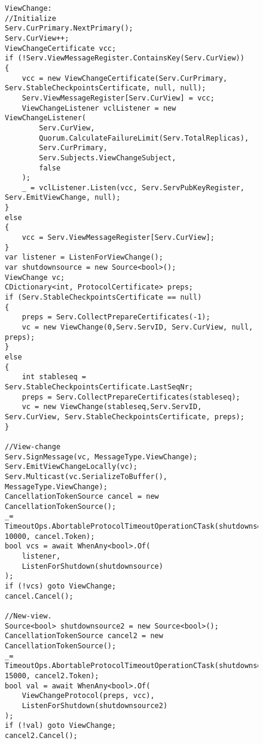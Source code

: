 \begin{figure}[H]
	\centering
	\begin{lstlisting}[label = code:viewchangefunc, caption=Overall source code for handling view-changes., captionpos = b, basicstyle=\scriptsize]
ViewChange:
//Initialize
Serv.CurPrimary.NextPrimary();
Serv.CurView++;
ViewChangeCertificate vcc;
if (!Serv.ViewMessageRegister.ContainsKey(Serv.CurView))
{
    vcc = new ViewChangeCertificate(Serv.CurPrimary, Serv.StableCheckpointsCertificate, null, null);
    Serv.ViewMessageRegister[Serv.CurView] = vcc;
    ViewChangeListener vclListener = new ViewChangeListener(
        Serv.CurView, 
        Quorum.CalculateFailureLimit(Serv.TotalReplicas), 
        Serv.CurPrimary, 
        Serv.Subjects.ViewChangeSubject, 
        false
    );
    _ = vclListener.Listen(vcc, Serv.ServPubKeyRegister, Serv.EmitViewChange, null);
}
else
{   
    vcc = Serv.ViewMessageRegister[Serv.CurView];
}
var listener = ListenForViewChange();
var shutdownsource = new Source<bool>();
ViewChange vc;
CDictionary<int, ProtocolCertificate> preps;
if (Serv.StableCheckpointsCertificate == null)
{
    preps = Serv.CollectPrepareCertificates(-1);
    vc = new ViewChange(0,Serv.ServID, Serv.CurView, null, preps);
}
else
{
    int stableseq = Serv.StableCheckpointsCertificate.LastSeqNr;
    preps = Serv.CollectPrepareCertificates(stableseq);
    vc = new ViewChange(stableseq,Serv.ServID, Serv.CurView, Serv.StableCheckpointsCertificate, preps);
} 

//View-change
Serv.SignMessage(vc, MessageType.ViewChange);
Serv.EmitViewChangeLocally(vc);
Serv.Multicast(vc.SerializeToBuffer(), MessageType.ViewChange);
CancellationTokenSource cancel = new CancellationTokenSource();
_= TimeoutOps.AbortableProtocolTimeoutOperationCTask(shutdownsource, 10000, cancel.Token);
bool vcs = await WhenAny<bool>.Of(
    listener, 
    ListenForShutdown(shutdownsource)
);
if (!vcs) goto ViewChange;
cancel.Cancel();
            
//New-view.
Source<bool> shutdownsource2 = new Source<bool>();
CancellationTokenSource cancel2 = new CancellationTokenSource();
_= TimeoutOps.AbortableProtocolTimeoutOperationCTask(shutdownsource2, 15000, cancel2.Token);
bool val = await WhenAny<bool>.Of(
    ViewChangeProtocol(preps, vcc), 
    ListenForShutdown(shutdownsource2)
);
if (!val) goto ViewChange;
cancel2.Cancel();
   \end{lstlisting}
\end{figure}


